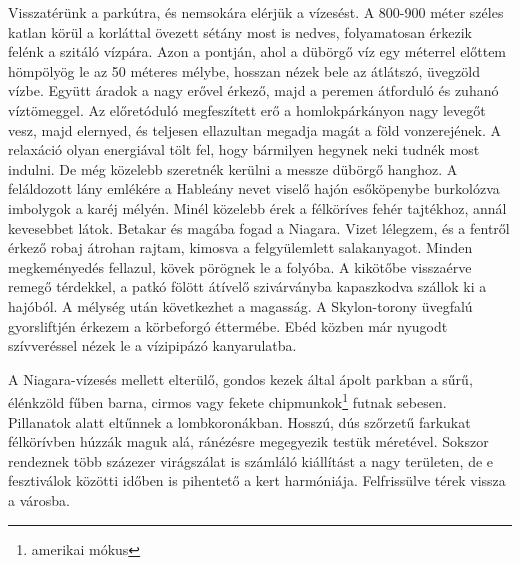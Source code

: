 Visszatérünk a parkútra, és nemsokára elérjük a vízesést. A 800-900
méter széles katlan körül a korláttal övezett sétány most is nedves,
folyamatosan érkezik felénk a szitáló vízpára. Azon a pontján, ahol a
dübörgő víz egy méterrel előttem hömpölyög le az 50 méteres mélybe,
hosszan nézek bele az átlátszó, üvegzöld vízbe. Együtt áradok a nagy
erővel érkező, majd a peremen átforduló és zuhanó víztömeggel. Az
előretóduló megfeszített erő a homlokpárkányon nagy levegőt vesz,
majd elernyed, és teljesen ellazultan megadja magát a föld vonzerejének.
A relaxáció olyan energiával tölt fel, hogy bármilyen hegynek
neki tudnék most indulni. De még közelebb szeretnék kerülni a messze
dübörgő hanghoz. A feláldozott lány emlékére a Hableány nevet
viselő hajón esőköpenybe burkolózva imbolygok a karéj mélyén. Minél
közelebb érek a félköríves fehér tajtékhoz, annál kevesebbet látok.
Betakar és magába fogad a Niagara. Vizet lélegzem, és a fentről érkező
robaj átrohan rajtam, kimosva a felgyülemlett salakanyagot. Minden
megkeményedés fellazul, kövek pörögnek le a folyóba. A kikötőbe
visszaérve remegő térdekkel, a patkó fölött átívelő szivárványba
kapaszkodva szállok ki a hajóból. A mélység után következhet a magasság.
A Skylon-torony üvegfalú gyorsliftjén érkezem a körbeforgó éttermébe.
Ebéd közben már nyugodt szívveréssel nézek le a vízipipázó kanyarulatba.

A Niagara-vízesés mellett elterülő, gondos kezek által ápolt parkban
a sűrű, élénkzöld fűben barna, cirmos vagy fekete chipmunkok\footnote{%
amerikai mókus}
futnak sebesen. Pillanatok alatt eltűnnek a lombkoronákban. Hosszú,
dús szőrzetű farkukat félkörívben húzzák maguk alá, ránézésre
megegyezik testük méretével. Sokszor rendeznek több százezer
virágszálat is számláló kiállítást a nagy területen, de e fesztiválok
közötti időben is pihentető a kert harmóniája. Felfrissülve térek vissza
a városba.

